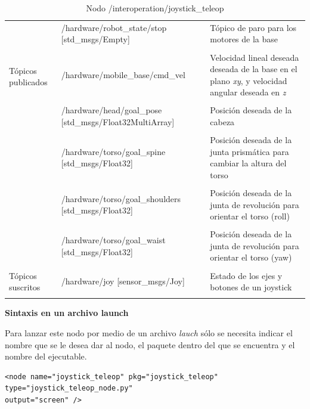 \documentclass[user_manual.tex]{subfiles}
\begin{document}
\begin{table}[H]
\begin{center}
\begin{tabular}{|l|p{6cm}|p{5cm}|}%
\hline

\multirow{6}{*}{Tópicos publicados}
& /hardware/robot\_state/stop [std\_msgs/Empty] & Tópico de paro para los motores de la base \\
& & \\
& /hardware/mobile\_base/cmd\_vel  & Velocidad lineal deseada deseada de la base en el plano \textit{xy}, y velocidad angular deseada en \textit{z} \\
& & \\
& /hardware/head/goal\_pose [std\_msgs/Float32MultiArray] & Posición deseada de la cabeza \\
& & \\
& /hardware/torso/goal\_spine [std\_msgs/Float32] & Posición deseada de la junta prismática para cambiar la altura del torso \\
& & \\
& /hardware/torso/goal\_shoulders [std\_msgs/Float32] & Posición deseada de la junta de revolución para orientar el torso (roll) \\
& & \\
& /hardware/torso/goal\_waist [std\_msgs/Float32] & Posición deseada de la junta de revolución para orientar el torso (yaw) \\
& & \\
\cline{1-3}

Tópicos suscritos
& /hardware/joy [sensor\_msgs/Joy]  & Estado de los ejes y botones de un joystick \\
& & \\
\hline

\end{tabular}
\caption{Nodo /interoperation/joystick\_teleop}
\label{joystick teleop node}
\end{center}
\end{table}

\textbf{Sintaxis en un archivo launch}

Para lanzar este nodo por medio de un archivo \textit{lauch} sólo se necesita indicar el nombre que se le desea dar al nodo, el paquete dentro del que se encuentra y el nombre del ejecutable.\\
\begin{verbatim}
<node name="joystick_teleop" pkg="joystick_teleop" type="joystick_teleop_node.py" 
output="screen" />
\end{verbatim}
\end{document}
